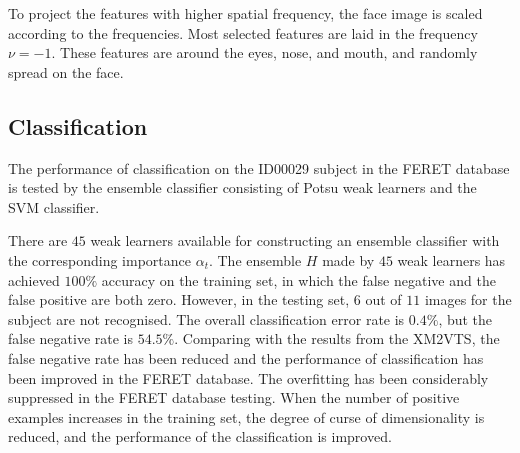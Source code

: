To project the features with higher spatial frequency, the face image is scaled according to the frequencies. Most selected features are laid in the frequency $\nu=-1$. These features are around the eyes, nose, and mouth, and randomly spread on the face. %

\subsection{Classification}
The performance of classification on the ID00029 subject in the \mbox{FERET} database is tested by the ensemble classifier consisting of Potsu weak learners and the SVM classifier.

There are $45$ weak learners available for constructing an ensemble classifier with the corresponding importance $\alpha_{t}$. The ensemble $H$ made by $45$ weak learners has achieved $100\%$ accuracy on the training set, in which the false negative and the false positive are both zero. However, in the testing set, $6$ out of $11$ images for the subject are not recognised. The overall classification error rate is $0.4\%$, but the false negative rate is $54.5\%$. Comparing with the results from the \mbox{XM2VTS}, the false negative rate has been reduced and the performance of classification has been improved in the \mbox{FERET} database. The overfitting has been considerably suppressed in the \mbox{FERET} database testing. When the number of positive examples increases in the training set, the degree of curse of dimensionality is reduced, and the performance of the classification is improved.

